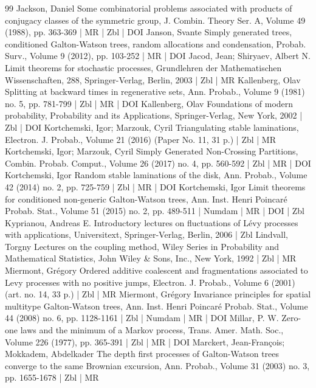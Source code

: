 \begin{thebibliography}{99}
Jackson, Daniel Some combinatorial problems associated with products of conjugacy classes of the symmetric group, J. Combin. Theory Ser. A, Volume 49 (1988), pp. 363-369 | MR | Zbl | DOI
Janson, Svante Simply generated trees, conditioned Galton-Watson trees, random allocations and condensation, Probab. Surv., Volume 9 (2012), pp. 103-252 | MR | DOI
Jacod, Jean; Shiryaev, Albert N. Limit theorems for stochastic processes, Grundlehren der Mathematischen Wissenschaften, 288, Springer-Verlag, Berlin, 2003 | Zbl | MR
Kallenberg, Olav Splitting at backward times in regenerative sets, Ann. Probab., Volume 9 (1981) no. 5, pp. 781-799 | Zbl | MR | DOI
Kallenberg, Olav Foundations of modern probability, Probability and its Applications, Springer-Verlag, New York, 2002 | Zbl | DOI
Kortchemski, Igor; Marzouk, Cyril Triangulating stable laminations, Electron. J. Probab., Volume 21 (2016) (Paper No. 11, 31 p.) | Zbl | MR
Kortchemski, Igor; Marzouk, Cyril Simply Generated Non-Crossing Partitions, Combin. Probab. Comput., Volume 26 (2017) no. 4, pp. 560-592 | Zbl | MR | DOI
Kortchemski, Igor Random stable laminations of the disk, Ann. Probab., Volume 42 (2014) no. 2, pp. 725-759 | Zbl | MR | DOI
Kortchemski, Igor Limit theorems for conditioned non-generic Galton-Watson trees, Ann. Inst. Henri Poincaré Probab. Stat., Volume 51 (2015) no. 2, pp. 489-511 | Numdam | MR | DOI | Zbl
Kyprianou, Andreas E. Introductory lectures on fluctuations of Lévy processes with applications, Universitext, Springer-Verlag, Berlin, 2006 | Zbl
Lindvall, Torgny Lectures on the coupling method, Wiley Series in Probability and Mathematical Statistics, John Wiley \& Sons, Inc., New York, 1992 | Zbl | MR
Miermont, Grégory Ordered additive coalescent and fragmentations associated to Levy processes with no positive jumps, Electron. J. Probab., Volume 6 (2001) (art. no. 14, 33 p.) | Zbl | MR
Miermont, Grégory Invariance principles for spatial multitype Galton-Watson trees, Ann. Inst. Henri Poincaré Probab. Stat., Volume 44 (2008) no. 6, pp. 1128-1161 | Zbl | Numdam | MR | DOI
Millar, P. W. Zero-one laws and the minimum of a Markov process, Trans. Amer. Math. Soc., Volume 226 (1977), pp. 365-391 | Zbl | MR | DOI
Marckert, Jean-François; Mokkadem, Abdelkader The depth first processes of Galton-Watson trees converge to the same Brownian excursion, Ann. Probab., Volume 31 (2003) no. 3, pp. 1655-1678 | Zbl | MR

\end{thebibliography}
